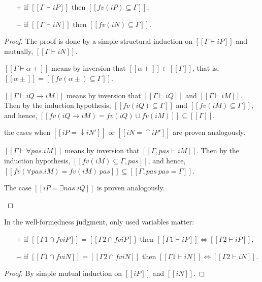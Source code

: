 \begin{lemma}
    \label{lemma:wf-soundness}
    \hfill

  \begin{itemize}
    \item[$+$] if $[[Γ ⊢ iP]]$ then $[[fv(iP) ⊆ Γ]]$;
    \item[$-$] if $[[Γ ⊢ iN]]$ then $[[fv(iN) ⊆ Γ]]$.
  \end{itemize}
\end{lemma}
\begin{proof}
  The proof is done by a simple structural induction on 
  $[[Γ⊢ iP]]$ and mutually, $[[Γ ⊢ iN]]$.
  \begin{caseof}
    \item $[[Γ ⊢ α±]]$ means by inversion that $[[α±]] \in [[Γ]]$,
      that is, $[[α±]] = [[fv(α±) ⊆ Γ]]$.
    \item $[[Γ ⊢ iQ → iM]]$ means by inversion that
      $[[Γ ⊢ iQ]]$ and $[[Γ ⊢ iM]]$.
      Then by the induction hypothesis, $[[fv(iQ) ⊆ Γ]]$ and $[[fv(iM) ⊆ Γ]]$,
      and hence, $[[fv(iQ → iM) = fv(iQ) ∪ fv(iM)]] \subseteq [[Γ]]$.
    \item the cases when $[[iP = ↓iN']]$ or $[[iN = ↑iP']]$ are proven analogously.
    \item $[[Γ ⊢ ∀pas.iM]]$ means by inversion that $[[Γ, pas ⊢ iM]]$.
      Then by the induction hypothesis, $[[fv(iM) ⊆ Γ, pas]]$, and hence,
      $[[fv(∀pas.iM) = fv(iM) \ {pas}]] \subseteq [[{Γ, pas} \ {pas} = Γ]]$.
    \item The case $[[iP = ∃nas.iQ]]$ is proven analogously.
  \end{caseof}
\end{proof}

\begin{lemma}
  \label{lemma:wf-ctxt-equiv}

  In the well-formedness judgment, only used variables matter:
  \begin{itemize}
  \item[$+$] if $[[Γ1 ∩ fv iP]] = [[Γ2 ∩ fv iP]]$ then
    $[[Γ1 ⊢ iP]] \iff [[Γ2 ⊢ iP]]$,
  \item[$-$] if $[[Γ1 ∩ fv iN]] = [[Γ2 ∩ fv iN]]$ then
    $[[Γ1 ⊢ iN]] \iff [[Γ2 ⊢ iN]]$.
  \end{itemize}
\end{lemma}
\begin{proof}
  By simple mutual induction on $[[iP]]$ and $[[iN]]$.
\end{proof}

